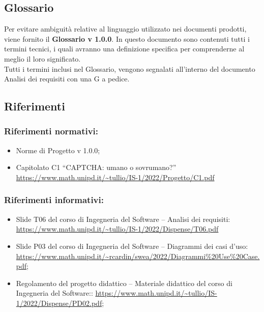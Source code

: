 \subsection{Glossario}
Per evitare ambiguità relative al linguaggio utilizzato nei documenti prodotti, viene fornito il \textbf{Glossario v 1.0.0}. In questo documento sono contenuti tutti i termini tecnici, i quali avranno una definizione specifica per comprenderne al meglio il loro significato.\\
Tutti i termini inclusi nel Glossario, vengono segnalati all'interno del documento Analisi dei requisiti con una G a pedice.

\subsection{Riferimenti}

\subsubsection{Riferimenti normativi:}\:
\begin{itemize}
	\item Norme di Progetto v 1.0.0;
	\item Capitolato C1 “CAPTCHA: umano o sovrumano?”
		\url{https://www.math.unipd.it/~tullio/IS-1/2022/Progetto/C1.pdf}
\end{itemize}

\subsubsection{Riferimenti informativi:}\:
\begin{itemize}
	\item Slide T06 del corso di Ingegneria del Software – Analisi dei requisiti:
		\url{https://www.math.unipd.it/~tullio/IS-1/2022/Dispense/T06.pdf}
	\item Slide P03 del corso di Ingegneria del Software – Diagrammi dei casi d'uso:
		\url{https://www.math.unipd.it/~rcardin/swea/2022/Diagrammi%20Use%20Case.pdf};
	\item Regolamento del progetto didattico – Materiale didattico del corso di Ingegneria del Software::
		\url{https://www.math.unipd.it/~tullio/IS-1/2022/Dispense/PD02.pdf};
\end{itemize}
